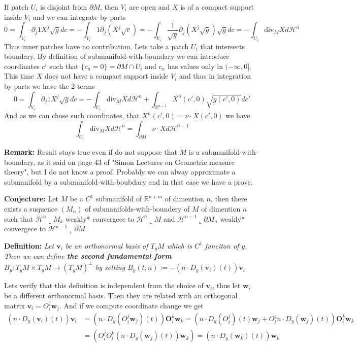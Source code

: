 \vspace{1ex}
If patch $U_i$ is disjoint from $\partial M$, then $V_i$ are open and $X$ is of
a compact support inside $V_i$ and we can integrate by parts
\[0=\int_{V_i}\partial_j 1X^j\sqrt gdc=-\int_{V_i}1\partial_j(X^j\sqrt c)=
-\int_{V_i}\frac{1}{\sqrt g}\partial_j(X^j\sqrt g)\sqrt gdc=-\int_{U_i}\text{div}_M Xd\mathcal H^n\]
Thus inner patches have no contribution. Lets take a patch $U_i$ that intersects
boundary. By definition of submanifold-with-boundary we can introduce coordinates
$c^i$ such that $\{c_n=0\}=\partial M\cap U_i$ and $c_n$ has values only in
$(-\infty,0]$. This time $X$ does not have a compact support inside $V_i$ and
thus in integration by parts we have the 2 terms
\[0=\int_{V_i}\partial_j 1X^j\sqrt gdc=-\int_{U_i}\text{div}_M Xd\mathcal H^n+\int_{\mathbb R^{n-1}}X^n(c',0)\sqrt{g(c',0)}dc'\]
And as we can chose such coordinates, that $X^n(c',0)=\nu\cdot X(c',0)$ we have
\[\int_{U_i}\text{div}_M Xd\mathcal H^n=\int_{\partial M}\nu\cdot Xd\mathcal H^{n-1}\]

\vspace{2ex}
\textbf{Remark:} Result stays true even if do not suppose that $M$ is a
submanifold-with-boundary, as it said on page 43 of "Simon Lectures on
Geometric measure theory", but I do not know a proof. Probably we can alway
approximate a submanifold by a submanifold-with-boubdary and in that case
we have a prove.

\vspace{2ex}
\textbf{Conjecture:} Let $M$ be a $C^1$ submanifold of $\mathbb{R}^{n+m}$ of
dimention $n$, then there exists a suquence $(M_n)$ of submanifolds-with-boundery
of $M$ of dimention $n$ such that $\mathcal H^n\llcorner M_k$ weakly* convergece to
$\mathcal H^n\llcorner M$ and $\mathcal H^{n-1}\llcorner\partial M_n$ weakly* convergece to 
$\mathcal H^{n-1}\llcorner\partial M$.

\vspace{2ex}
\textbf{Definition:} \textit{Let $\mathbf{v}_i$ be an orthonormal basis of $T_yM$ which
is $C^1$ funciton of $y$. Then we can define \textbf{the second fundamental form}
$B_y:T_yM\times T_yM\rightarrow (T_yM)^\perp$ by setting $B_y(t,n):=-(n\cdot D_y
(\mathbf v_i)(t))\mathbf v_i$
}

\vspace{2ex} Lets verify that this definition is independent from the choice of
$\mathbf v_i$, thus let $\mathbf w_i$ be a different orthonormal basis. Then
they are related with an orthogonal matrix $\mathbf v_i=O_i^j\mathbf w_j$. And
if we compute coordinate change we get
\begin{align*}
    (n\cdot D_y(\mathbf v_i)(t))\mathbf v_i&=(n\cdot D_y(O_i^j\mathbf w_j)(t))\mathbf O_i^k\mathbf w_k
=(n\cdot D_y(O_i^j)(t)\mathbf w_j + O_i^j n\cdot D_y(\mathbf w_j)(t))\mathbf O_i^k\mathbf w_k\\
    &=(O_i^jO_i^k(n\cdot D_y(\mathbf w_j)(t))\mathbf w_k)=(n\cdot D_y(\mathbf w_k)(t))\mathbf w_k
\end{align*}

